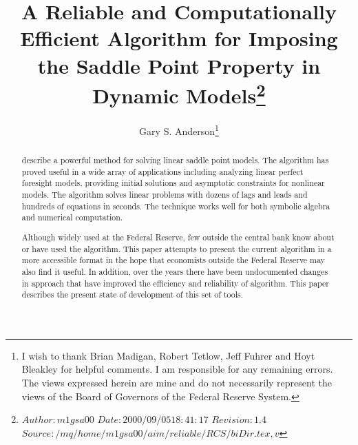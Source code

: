 \documentclass{article}
\begin{document}


%


\setlength{\unitlength}{2em}


  
\author{Gary S. Anderson\thanks{
I wish to thank Brian Madigan, Robert Tetlow,
Jeff Fuhrer and Hoyt Bleakley for helpful comments.
I am responsible for
any remaining errors.
The views expressed herein are mine and 
do not necessarily represent the views of the Board of Governors of the Federal
Reserve System.
}}
\title{ A Reliable and Computationally Efficient Algorithm for 
Imposing the Saddle Point Property in Dynamic Models\footnote{
$Author: m1gsa00 $  $Date: 2000/09/05 18:41:17 $ $Revision: 1.4 $\newline $Source: /mq/home/m1gsa00/aim/reliable/RCS/biDir.tex,v $    
}}
\maketitle
\begin{abstract}
\cite{ANDER:AIM1,ANDER:AIM2} describe a powerful method for solving linear saddle point models.
The algorithm has proved 
useful in a wide array of applications including
analyzing linear perfect foresight models, providing initial
solutions and asymptotic constraints for
nonlinear models.
The algorithm  solves linear problems with dozens of lags and leads
and hundreds of equations in seconds.
The technique works well for both symbolic algebra and numerical computation.

Although widely used at the Federal Reserve, few outside the central bank know
about or have used the algorithm.
This paper attempts to present the current algorithm in a more accessible
format in the hope that economists outside the Federal Reserve may also find it
useful.
In addition, over the years there have been 
 undocumented changes in approach that have improved
the efficiency and reliability
of algorithm.
This paper describes the present state of development of this set of tools.
\end{abstract}
\end{document}
